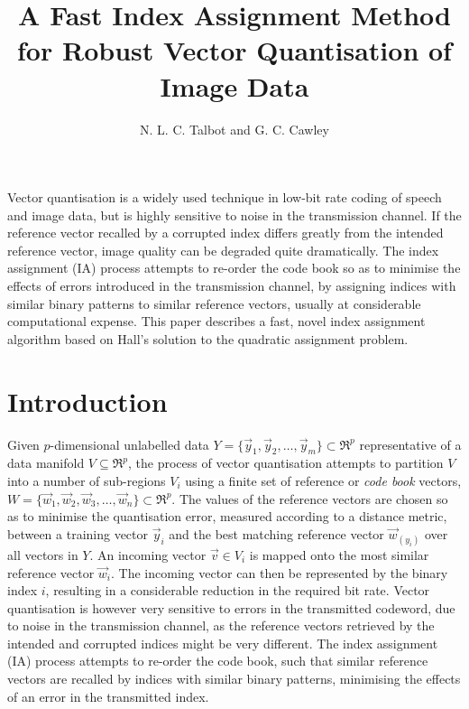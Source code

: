 \documentclass[a4paper]{report}
\title{A Fast Index Assignment Method for Robust Vector Quantisation of Image Data}
\author{N. L. C. Talbot and G. C. Cawley}
\begin{document}
\maketitle

\tableofcontents
Vector quantisation is a widely used technique in low-bit rate coding of speech
and image data, but is highly sensitive to noise in the transmission channel.
If the reference vector recalled by a corrupted index differs greatly from the
intended reference vector, image quality can be degraded quite dramatically.
The index assignment (IA) process attempts to re-order the code book so as to
minimise the effects of errors introduced in the transmission channel, by
assigning indices with similar binary patterns to similar reference vectors,
usually at considerable computational expense.  This paper describes a fast,
novel index assignment algorithm based on Hall's solution to the quadratic
assignment problem.
\chapter{Introduction}

Given $p$-dimensional unlabelled data
$Y = \{\vec{y}_1, \vec{y}_2, \ldots, \vec{y}_m\}\subset\Re^p$ representative
of a data manifold $V \subseteq\Re^p$, the process
of vector quantisation attempts to partition $V$ into a number
of sub-regions $V_i$ using a finite set of reference or \emph{code book}
vectors, $W = \{\vec{w}_1, \vec{w}_2, \vec{w}_3, \ldots, \vec{w}_n\}
\subset\Re^p$.  The values of the reference vectors are chosen so as
to minimise the quantisation error, measured according to a distance metric,
between a training vector $\vec{y}_i$ and the best matching reference vector
$\vec{w}_{(y_i)}$ over all vectors in $Y$.  An incoming vector
$\vec{v} \in V_i$ is mapped onto the most similar reference vector
$\vec{w}_i$.  The incoming vector can then be represented by the binary index $i$,
resulting in a considerable reduction in the required bit rate.
Vector quantisation is however very sensitive to errors in the transmitted
codeword, due to noise in the transmission channel, as the reference vectors
retrieved by the intended and corrupted indices might be very different.  The
index assignment (IA) process attempts to re-order the code book, such that
similar reference vectors are recalled by indices with similar binary
patterns, minimising the effects of an error in the
transmitted index.
\end{document}
